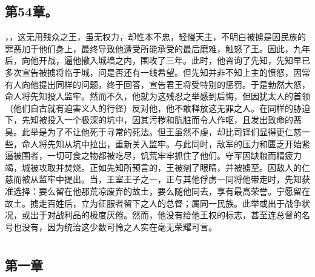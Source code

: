 
\subsection{第54章。}

，，这无用残众之王，虽无权力，却性本不忠，轻慢天主，不明白被掳是因民族的罪恶加于他们身上，最终导致他遭受所能承受的最后磨难，触怒了王。因此，九年后，向他开战，逼他撤入城墙之内，围攻了三年。此时，他咨询了先知，先知早已多次宣告被掳将临于城，问是否还有一线希望。但先知并非不知上主的愤怒，因常有人向他提出同样的问题，终于回答，宣告君王将受特别的惩罚。于是勃然大怒，命人将先知投入监牢。然而不久，他就为这残忍之举感到后悔，但因犹太人的首领（他们自古就有迫害义人的行径）反对他，他不敢释放这无罪之人。在同样的胁迫下，先知被投入一个极深的坑中，因其污秽和肮脏而令人作呕，且发出致命的恶臭。此举是为了不让他死于寻常的死法。但王虽然不虔，却比司铎们显得更仁慈一些，命人将先知从坑中拉出，重新关入监牢。与此同时，敌军的压力和匮乏开始紧逼被围者，一切可食之物都被吃尽，饥荒牢牢抓住了他们。守军因缺粮而精疲力竭，城被攻取并焚烧。正如先知所预言的，王被剜了眼睛，并被掳至。因敌人的仁慈而被从监牢中提出。当，王室王子之一，正与其他俘虏一同将他带走时，先知获准选择：要么留在他那荒凉废弃的故土，要么随他同去，享有最高荣誉。宁愿留在故土。掳走百姓后，立为征服者留下之人的总督；属同一民族。此举或出于战争状况，或出于对战利品的极度厌倦。然而，他没有给他王权的标志，甚至连总督的名号也没有，因为统治这少数可怜之人实在毫无荣耀可言。\par



\section{}


\subsection{第一章}


